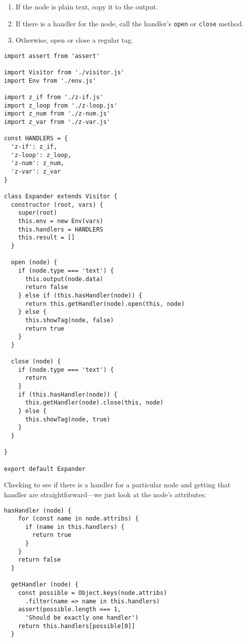 \documentclass[krantzl]{krantz}
\begin{document}
\begin{enumerate}

\item 

If the node is plain text, copy it to the output.



\item 

If there is a handler for the node,
    call the handler’s \texttt{open} or \texttt{close} method.



\item 

Otherwise, open or close a regular tag.



\end{enumerate}


\begin{lstlisting}[frame=tblr]
import assert from 'assert'

import Visitor from './visitor.js'
import Env from './env.js'

import z_if from './z-if.js'
import z_loop from './z-loop.js'
import z_num from './z-num.js'
import z_var from './z-var.js'

const HANDLERS = {
  'z-if': z_if,
  'z-loop': z_loop,
  'z-num': z_num,
  'z-var': z_var
}

class Expander extends Visitor {
  constructor (root, vars) {
    super(root)
    this.env = new Env(vars)
    this.handlers = HANDLERS
    this.result = []
  }

  open (node) {
    if (node.type === 'text') {
      this.output(node.data)
      return false
    } else if (this.hasHandler(node)) {
      return this.getHandler(node).open(this, node)
    } else {
      this.showTag(node, false)
      return true
    }
  }

  close (node) {
    if (node.type === 'text') {
      return
    }
    if (this.hasHandler(node)) {
      this.getHandler(node).close(this, node)
    } else {
      this.showTag(node, true)
    }
  }

}

export default Expander
\end{lstlisting}



Checking to see if there is a handler for a particular node
and getting that handler are straightforward—we just
look at the node’s attributes:


\begin{lstlisting}[frame=tblr]
  hasHandler (node) {
    for (const name in node.attribs) {
      if (name in this.handlers) {
        return true
      }
    }
    return false
  }

  getHandler (node) {
    const possible = Object.keys(node.attribs)
      .filter(name => name in this.handlers)
    assert(possible.length === 1,
      'Should be exactly one handler')
    return this.handlers[possible[0]]
  }
\end{lstlisting}
\end{document}
